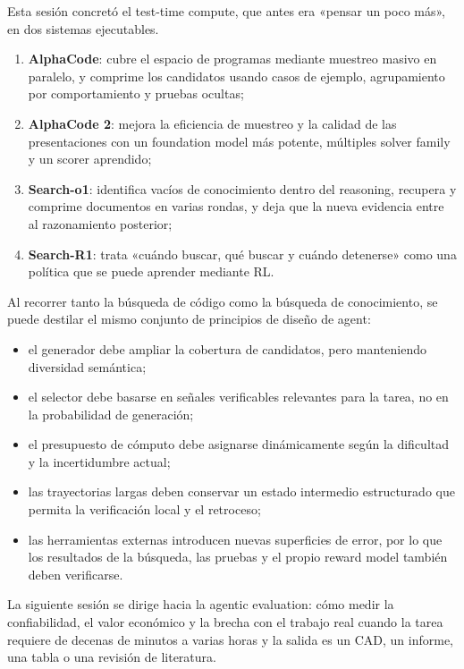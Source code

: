\documentclass[a4paper]{article}
\begin{document}
Esta sesión concretó el test-time compute, que antes era «pensar un poco más», en dos sistemas ejecutables.

\begin{enumerate}
    \item \textbf{AlphaCode}: cubre el espacio de programas mediante muestreo masivo en paralelo, y comprime los candidatos usando casos de ejemplo, agrupamiento por comportamiento y pruebas ocultas;
    \item \textbf{AlphaCode 2}: mejora la eficiencia de muestreo y la calidad de las presentaciones con un foundation model más potente, múltiples solver family y un scorer aprendido;
    \item \textbf{Search-o1}: identifica vacíos de conocimiento dentro del reasoning, recupera y comprime documentos en varias rondas, y deja que la nueva evidencia entre al razonamiento posterior;
    \item \textbf{Search-R1}: trata «cuándo buscar, qué buscar y cuándo detenerse» como una política que se puede aprender mediante RL.
\end{enumerate}

Al recorrer tanto la búsqueda de código como la búsqueda de conocimiento, se puede destilar el mismo conjunto de principios de diseño de agent:

\begin{itemize}
    \item el generador debe ampliar la cobertura de candidatos, pero manteniendo diversidad semántica;
    \item el selector debe basarse en señales verificables relevantes para la tarea, no en la probabilidad de generación;
    \item el presupuesto de cómputo debe asignarse dinámicamente según la dificultad y la incertidumbre actual;
    \item las trayectorias largas deben conservar un estado intermedio estructurado que permita la verificación local y el retroceso;
    \item las herramientas externas introducen nuevas superficies de error, por lo que los resultados de la búsqueda, las pruebas y el propio reward model también deben verificarse.
\end{itemize}

La siguiente sesión se dirige hacia la agentic evaluation: cómo medir la confiabilidad, el valor económico y la brecha con el trabajo real cuando la tarea requiere de decenas de minutos a varias horas y la salida es un CAD, un informe, una tabla o una revisión de literatura.
\end{document}
